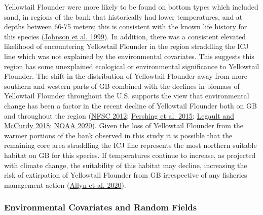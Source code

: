 \documentclass[
]{article}
\begin{document}
Yellowtail Flounder were more likely to be found on bottom types which included sand, in regions of the bank that historically had lower temperatures, and at depths between 66-75 meters; this is consistent with the known life history for this species (\protect\hyperlink{ref-johnsonYellowtailFlounderLimanda1999}{Johnson et al. 1999}). In addition, there was a consistent elevated likelihood of encountering Yellowtail Flounder in the region straddling the ICJ line which was not explained by the environmental covariates. This suggests this region has some unexplained ecological or environmental significance to Yellowtail Flounder. The shift in the distribution of Yellowtail Flounder away from more southern and western parts of GB combined with the declines in biomass of Yellowtail Flounder throughout the U.S. supports the view that environmental change has been a factor in the recent decline of Yellowtail Flounder both on GB and throughout the region (\protect\hyperlink{ref-nfsc54thNortheastRegional2012}{NFSC 2012}; \protect\hyperlink{ref-pershingSlowAdaptationFace2015}{Pershing et al. 2015}; \protect\hyperlink{ref-legaultStockAssessmentGeorges2018}{Legault and McCurdy 2018}; \protect\hyperlink{ref-NOAAYellowtailFlounder2020}{NOAA 2020}). Given the loss of Yellowtail Flounder from the warmer portions of the bank observed in this study it is possible that the remaining core area straddling the ICJ line represents the most northern suitable habitat on GB for this species. If temperatures continue to increase, as projected with climate change, the suitability of this habitat may decline, increasing the risk of extirpation of Yellowtail Flounder from GB irrespective of any fisheries management action (\protect\hyperlink{ref-allynComparingSynthesizingQuantitative2020}{Allyn et al. 2020}).

\hypertarget{environmental-covariates-and-random-fields}{%
\subsubsection{Environmental Covariates and Random Fields}\label{environmental-covariates-and-random-fields}}
\end{document}
